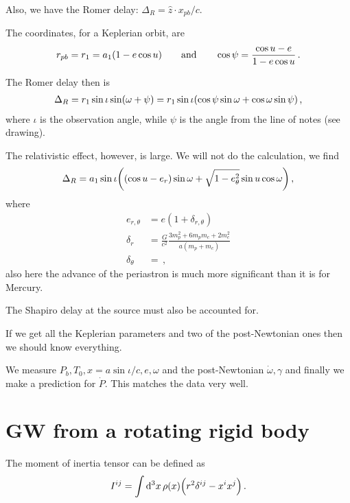 \documentclass[main.tex]{subfiles}
\begin{document}
Also, we have the Romer delay: \(\Delta_{R} = \hat{z} \cdot x_{pb} / c\). 

The coordinates, for a Keplerian orbit, are 
%
\begin{align}
r_{pb} = r_1 = a_1 \qty(1 - e \cos u )
\qquad \text{and} \qquad
\cos \psi = \frac{\cos u - e}{1- e \cos u}
\,.
\end{align}

The Romer delay then is 
%
\begin{align}
\Delta_{R} = r_1 \sin \iota \sin(\omega+\psi ) 
= r_1 \sin \iota \qty(\cos \psi \sin \omega + \cos \omega \sin \psi )
\,,
\end{align}
%
where \(\iota \) is the observation angle, while \(\psi \) is the angle from the line of notes (see drawing). 

The relativistic effect, however, is large. 
We will not do the calculation, we find 
%
\begin{align}
\Delta_{R} = a_1 \sin \iota 
\qty((\cos u - e_r ) \sin \omega + \sqrt{1 - e^2_{\theta }} \sin u \cos \omega )
\,, 
\end{align}
%
where 
%
\begin{subequations}
\begin{align}
e_{r, \theta } &= e (1 + \delta_{r, \theta })  \\
\delta_{r} &= \frac{G}{c^2} \frac{3 m_p^2 + 6 m_p m_c + 2 m_c^2}{a (m_p + m_c)}  \\
\delta_{\theta } &= 
\,,
\end{align}
\end{subequations}
%
also here the advance of the periastron is much more significant than it is for Mercury. 

The Shapiro delay at the source must also be accounted for. 

If we get all the Keplerian parameters and two of the post-Newtonian ones then we should know everything.

We measure \(P_b, T_0, x= a \sin \iota /c, e, \omega \) and the post-Newtonian \(\dot{\omega}, \gamma \) and finally we make a prediction for \(\dot{P}\). This matches the data very well.

\section{GW from a rotating rigid body}

The moment of inertia tensor can be defined as 
%
\begin{align}
I^{ij} = \int \dd[3]{x} \rho (x) \qty(r^2 \delta^{ij} - x^{i} x^{j})
\,.
\end{align}
\end{document}
